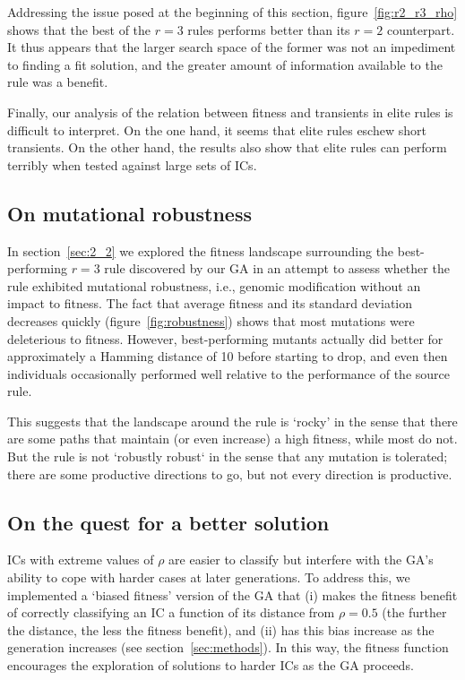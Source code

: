 Addressing the issue posed at the beginning of this section, figure~\ref{fig:r2_r3_rho} shows that the best of the $r = 3$ rules performs better than 
its $r = 2$ counterpart. It thus appears that the larger search space of the former was not an impediment to finding a fit solution, and the greater 
amount of information available to the rule was a benefit.

Finally, our analysis of the relation between fitness and transients in elite rules is difficult to interpret. On the one hand, it seems that elite rules 
eschew short transients. On the other hand, the results also show that elite rules can perform terribly when tested against large sets of ICs.  

\subsection{On mutational robustness}

In section~\ref{sec:2_2} we explored the fitness landscape surrounding the best-performing $r = 3$ rule discovered by our GA in an attempt to 
assess whether the rule exhibited mutational robustness, i.e., genomic modification without an impact to fitness. The fact that average fitness 
and its standard deviation decreases quickly (figure~\ref{fig:robustness}) shows that most mutations were deleterious to fitness. However, best-performing mutants actually did better for approximately a Hamming distance of 10 before starting to drop, and even then individuals occasionally performed 
well relative to the performance of the source rule.

This suggests that the landscape around the rule is `rocky' in the sense that there are some paths that maintain (or even increase) a high 
fitness, while most do not. But the rule is not `robustly robust` in the sense that any mutation is tolerated; there are some productive directions to go, but 
not every direction is productive.

\subsection{On the quest for a better solution}

ICs with extreme values of $\rho$ are easier to classify but interfere with the GA's ability to cope with harder cases at later generations. To address this, 
we implemented a `biased fitness' version of the GA that (i) makes the fitness benefit of correctly classifying an IC a function of its distance from 
$\rho = 0.5$ (the further the distance, the less the fitness benefit), and (ii) has this bias increase as the generation increases 
(see section~\ref{sec:methods}). In this way, the fitness function encourages the exploration of solutions to harder ICs as the GA proceeds.

